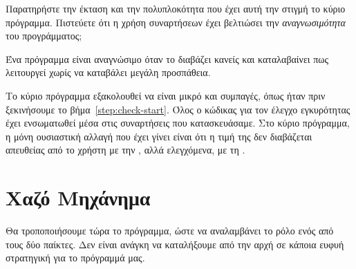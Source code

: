 \documentclass[a4paper,11pt,oneside]{book}
\begin{document}
\begin{step}
Παρατηρήστε την έκταση και την πολυπλοκότητα που έχει αυτή την στιγμή το κύριο πρόγραμμα. Πιστεύετε ότι η χρήση συναρτήσεων έχει βελτιώσει την \emph{αναγνωσιμότητα} του προγράμματος;

\begin{note}
Ένα πρόγραμμα είναι αναγνώσιμο όταν το διαβάζει κανείς και καταλαβαίνει πως λειτουργεί χωρίς να καταβάλει μεγάλη προσπάθεια.
\end{note}

\begin{answer}
Το κύριο πρόγραμμα εξακολουθεί να είναι μικρό και συμπαγές, όπως ήταν πριν ξεκινήσουμε το βήμα~\ref{step:check-start}. Όλος ο κώδικας για τον έλεγχο εγκυρότητας έχει ενσωματωθεί μέσα στις συναρτήσεις που κατασκευάσαμε. Στο κύριο πρόγραμμα, η μόνη ουσιαστική αλλαγή που έχει γίνει είναι ότι η τιμή της  δεν διαβάζεται απευθείας από το χρήστη με την , αλλά ελεγχόμενα, με τη .
\end{answer}
\end{step}

\section{Χαζό Μηχάνημα}
Θα τροποποιήσουμε τώρα το πρόγραμμα, ώστε να αναλαμβάνει το ρόλο ενός από τους δύο παίκτες. Δεν είναι ανάγκη να καταλήξουμε από την αρχή σε κάποια ευφυή στρατηγική για το πρόγραμμά μας.
\end{document}
